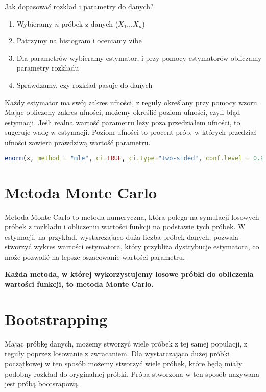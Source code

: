 \documentclass{../notatki}
\begin{document}
Jak dopasować rozkład i parametry do danych?

\begin{enumerate}
  \item Wybieramy $n$ próbek z danych ($X_1 \dots X_n$)
  \item Patrzymy na histogram i oceniamy vibe
  \item Dla parametrów wybieramy estymator, i przy pomocy estymatorów
    obliczamy parametry rozkładu
  \item Sprawdzamy, czy rozkład pasuje do danych
\end{enumerate}

Każdy estymator ma swój zakres ufności, z reguły określany przy pomocy wzoru.
Mając obliczony zakres ufności, możemy określić poziom ufności, czyli błąd
estymacji. Jeśli realna wartość parametru leży poza przedziałem ufności, to
sugeruje wadę w estymacji. Poziom ufności to procent prób, w których przedział
ufności zawiera prawdziwą wartość parametru.

\begin{lstlisting}[language=R, caption=estymuj parametry rozkładu normalnego]
  enorm(x, method = "mle", ci=TRUE, ci.type="two-sided", conf.level = 0.95)
\end{lstlisting}

\section{Metoda Monte Carlo}

Metoda Monte Carlo to metoda numeryczna, która polega na symulacji losowych
próbek z rozkładu i obliczeniu wartości funkcji na podstawie tych próbek. W
estymacji, na przykład, wystarczająco duża liczba próbek danych,
pozwala stworzyć
wykres wartości estymatora, który przybliża dystrybucje estymatora, co może
pozwolić na lepsze oszacowanie wartości parametru.

\textbf{Każda metoda, w której wykorzystujemy losowe próbki do
obliczenia wartości funkcji, to metoda Monte Carlo.}

\section{Bootstrapping}

Mając próbkę danych, możemy stworzyć wiele próbek z tej samej
populacji, z reguły poprzez losowanie z zwracaniem. Dla wystarczająco dużej
próbki początkowej w ten sposób możemy stworzyć wiele próbek, które
będą miały podobny rozkład do oryginalnej próbki. Próba stworzona w ten sposób
nazywana jest próbą bootsrapową.
\end{document}
